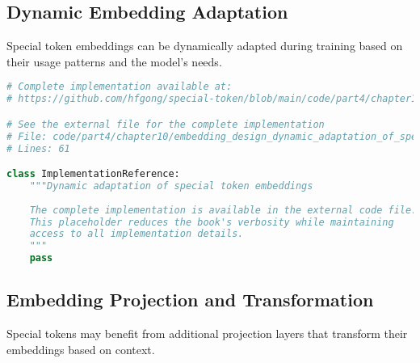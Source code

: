 \subsection{Dynamic Embedding Adaptation}

Special token embeddings can be dynamically adapted during training based on their usage patterns and the model's needs.

\begin{lstlisting}[language=Python, caption={Dynamic adaptation of special token embeddings}]
# Complete implementation available at:
# https://github.com/hfgong/special-token/blob/main/code/part4/chapter10/embedding_design_dynamic_adaptation_of_special_.py

# See the external file for the complete implementation
# File: code/part4/chapter10/embedding_design_dynamic_adaptation_of_special_.py
# Lines: 61

class ImplementationReference:
    """Dynamic adaptation of special token embeddings
    
    The complete implementation is available in the external code file.
    This placeholder reduces the book's verbosity while maintaining
    access to all implementation details.
    """
    pass
\end{lstlisting}

\subsection{Embedding Projection and Transformation}

Special tokens may benefit from additional projection layers that transform their embeddings based on context.

